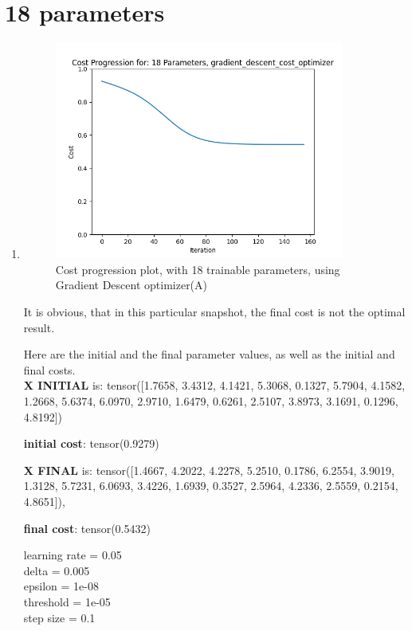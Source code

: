 \documentclass[inscr,ack,preface]{diphdthesis}
\begin{document}
\section{18 parameters}
\begin{enumerate}[label=\textbf{\Alph*.}]
\item \textbf{ }
\begin{figure}[H]
\begin{center}
    \includegraphics[width=0.9\textwidth]{plots/18.png}
    \caption{Cost progression plot, with 18 trainable parameters, using Gradient Descent optimizer(A)} 
    \label{fig:enter-label}
    \end{center}
\end{figure}

It is obvious, that in this particular snapshot, the final cost is not the optimal result.

Here are the initial and the final parameter values, as well as the initial and final costs. \\

\textbf{X INITIAL} is:
 tensor([1.7658, 3.4312, 4.1421, 5.3068, 0.1327, 5.7904, 4.1582, 1.2668, 5.6374,
        6.0970, 2.9710, 1.6479, 0.6261, 2.5107, 3.8973, 3.1691, 0.1296, 4.8192])

\textbf{initial cost}: tensor(0.9279)

\textbf{X FINAL} is:
 tensor([1.4667, 4.2022, 4.2278, 5.2510, 0.1786, 6.2554, 3.9019, 1.3128, 5.7231,
        6.0693, 3.4226, 1.6939, 0.3527, 2.5964, 4.2336, 2.5559, 0.2154, 4.8651]),

\textbf{final cost}: tensor(0.5432)

learning rate =  0.05\\ 
delta =  0.005 \\
epsilon =  1e-08 \\
threshold =  1e-05 \\
step size =  0.1 \\


\end{enumerate}
\end{document}
